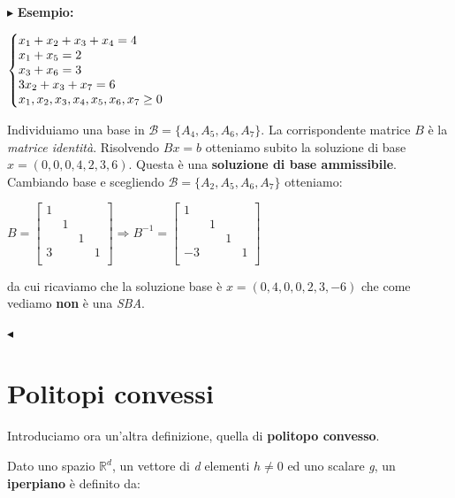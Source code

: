 \documentclass[11pt]{book}
\makeatletter
\newenvironment{sistema}%
{\left\lbrace\begin{array}{@{}l@{}}}%
{\end{array}\right.}
\makeatother
\begin{document}
\vspace{11pt}
$\blacktriangleright$ {\bf Esempio:}

\begin{center}
$\begin{sistema}
x_1 + x_2 + x_3 + x_4 = 4 \\
x_1 + x_5 = 2 \\
x_3 + x_6 = 3 \\
3x_2 + x_3 + x_7 = 6 \\
x_1, x_2, x_3, x_4, x_5, x_6, x_7 \geq 0
\end{sistema}$
\end{center}

Individuiamo una base in $\mathcal{B} = \{ A_4, A_5, A_6, A_7\}$. La
corrispondente matrice $B$ \`e la {\em matrice identit\`a}. Risolvendo
$Bx = b$ otteniamo subito la soluzione di base $x =
(0,0,0,4,2,3,6)$. Questa \`e una {\bf soluzione di base
  ammissibile}. Cambiando base e scegliendo $\mathcal{B} = \{ A_2,
A_5, A_6, A_7 \}$ otteniamo:

\begin{center}$
B = \begin{bmatrix}
1 & & & \\
& 1 & & \\
& & 1 & \\
3 & & & 1 \\
\end{bmatrix}\Rightarrow
B^{-1} = 
\begin{bmatrix}
1 & & & \\
& 1 & & \\
& & 1 & \\
-3 & & & 1 \\  
\end{bmatrix}$
\end{center}

da cui ricaviamo che la soluzione base \`e $x = (0,4,0,0,2,3,-6)$ che
come vediamo {\bf non} \`e una {\em SBA}.

$\blacktriangleleft$
\newline\vspace{11pt}

\section{Politopi convessi}

Introduciamo ora un'altra definizione, quella di {\bf politopo
  convesso}. 

Dato uno spazio $\mathbb{R}^d$, un vettore di {\em d} elementi $h \neq 0$ ed uno scalare
{\em g}, un {\bf iperpiano} \`e definito da: 
\end{document}
